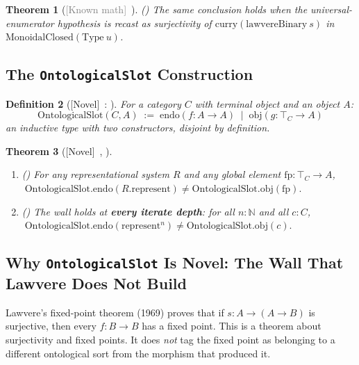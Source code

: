 \documentclass[11pt]{article}
\newtheorem{theorem}{Theorem}[section]
\newtheorem{definition}[theorem]{Definition}
\newcommand{\novel}{\textcolor{blue!70!black}{[Novel]}}
\newcommand{\known}{\textcolor{gray}{[Known math]}}
\begin{document}
\begin{theorem}[\known\ ]
\label{thm:lawvere-ccc}
() The same conclusion holds when the universal-enumerator hypothesis is recast as surjectivity of $\mathrm{curry}(\mathrm{lawvereBinary}\ s)$ in $\mathrm{MonoidalClosed}(\mathrm{Type}\ u)$.
\end{theorem}

\subsection{The \texttt{OntologicalSlot} Construction}
\label{sec:ontoslot}

\begin{definition}[\novel\ : ]
\label{def:ontoslot}
For a category $C$ with terminal object and an object $A$:
\[
\mathrm{OntologicalSlot}(C, A) \;:=\;
  \mathrm{endo}(f : A \to A) \;\mid\; \mathrm{obj}(g : \top_C \to A)
\]
an inductive type with two constructors, disjoint by definition.
\end{definition}

\begin{theorem}[\novel\ , ]
\label{thm:wall}
\leavevmode
\begin{enumerate}[label=(\alph*)]
\item () For any representational system $R$ and any global element $\mathrm{fp} : \top_C \to A$,
$\;\mathrm{OntologicalSlot.endo}(R.\mathrm{represent}) \neq \mathrm{OntologicalSlot.obj}(\mathrm{fp}).$
\item () The wall holds at \textbf{every iterate depth}: for all $n : \mathbb{N}$ and all $c : C$,
$\;\mathrm{OntologicalSlot.endo}(\mathrm{represent}^n) \neq \mathrm{OntologicalSlot.obj}(c).$
\end{enumerate}
\end{theorem}

\subsection{Why \texttt{OntologicalSlot} Is Novel: The Wall That Lawvere Does Not Build}
\label{sec:ontoslot-novelty}

Lawvere's fixed-point theorem (1969) proves that if $s : A \to (A \to B)$
is surjective, then every $f : B \to B$ has a fixed point.  This is a
theorem about surjectivity and fixed points.  It does \emph{not} tag the
fixed point as belonging to a different ontological sort from the
morphism that produced it.
\end{document}
